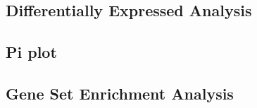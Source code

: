 \subsection{Differentially Expressed Analysis} \label{s:lit:dea}

\subsection{Pi plot} \label{s:lit:pi}

\subsection{Gene Set Enrichment Analysis} \label{s:lit:gsea}



